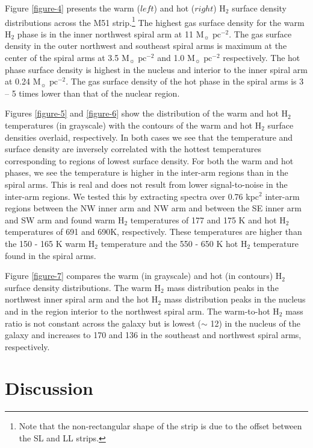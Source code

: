 \documentclass[manuscript]{aastex}
\begin{document}
Figure \ref{figure-4} presents the warm ($left$) and hot ($right$)
H$_2$ surface density distributions across the M51 
strip.\footnote{Note that the non-rectangular shape of the strip 
is due to the offset between the SL and LL strips.}  The highest 
gas surface density for the warm H$_2$ phase is in 
the inner northwest spiral arm at 11 $\mathrm{M_\sun}$ 
$\mathrm{pc^{-2}}$. The gas surface density in the outer 
northwest and southeast spiral arms is maximum at the 
center of the spiral arms at 3.5 $\mathrm{M_\sun}$ 
$\mathrm{pc^{-2}}$ and 1.0 $\mathrm{M_\sun}$ $\mathrm{pc^{-2}}$ 
respectively.  The hot phase surface density is highest in 
the nucleus and interior to the inner spiral arm at 0.24 
$\mathrm{M_\sun}$ $\mathrm{pc^{-2}}$.  The gas surface 
density of the hot phase in the spiral arms is 3 -- 5 times 
lower than that of the nuclear region.

Figures \ref{figure-5} and \ref{figure-6} show the distribution 
of the warm and hot H$_2$ temperatures (in grayscale) with 
the contours of the warm and hot H$_2$ surface densities overlaid, respectively.  In 
both cases we see that the temperature and surface density 
are inversely correlated with the hottest temperatures 
corresponding to regions of lowest surface density.  For 
both the warm and hot phases, we see the temperature 
is higher in the inter-arm regions than in the spiral arms. 
This is real and does not result from lower signal-to-noise 
in the inter-arm regions.   We tested this by extracting spectra 
over 0.76 kpc$^2$ inter-arm regions between the NW inner arm and NW 
arm and between the SE inner arm and SW arm and found warm H$_2$ 
temperatures of 177 and 175 K and hot H$_2$ temperatures 
of 691 and 690K, respectively.  These temperatures are higher 
than the 150 - 165 K warm H$_2$ temperature and the 550 - 650 
K hot H$_2$ temperature found in the spiral arms.

Figure \ref{figure-7} compares the warm (in grayscale) 
and hot (in contours) H$_2$ surface density distributions.   
The warm H$_2$ mass distribution peaks
in the northwest inner spiral arm and the hot H$_2$ 
mass distribution peaks in the nucleus and in the 
region interior to the northwest spiral arm.  The warm-to-hot 
H$_2$ mass ratio is not constant across 
the galaxy but is lowest ($\sim$ 12) in the nucleus of the 
galaxy and increases to 170 and 136 in the southeast 
and northwest spiral arms, respectively.

\section{Discussion}
\end{document}
